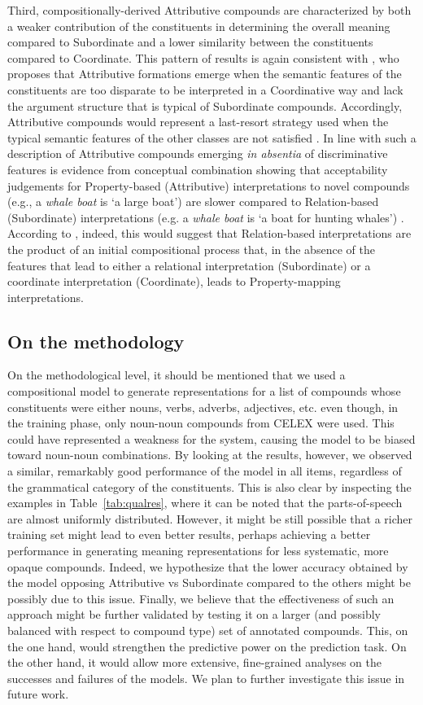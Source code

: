 \documentclass[output=paper]{langsci/langscibook}
\begin{document}
Third, compositionally-derived Attributive compounds are characterized by both a weaker contribution of the constituents in determining the overall meaning compared to Subordinate and a lower similarity between the constituents compared to Coordinate. This pattern of results is again consistent with \cite{lieber5OHC}, who proposes that Attributive formations emerge when the semantic
features of the constituents are too disparate to be interpreted in a Coordinative way and lack the argument structure that is typical of Subordinate compounds. Accordingly, Attributive compounds would represent a last-resort strategy used when the typical semantic features of the other classes are not satisfied \citep{lieber5OHC}. In line with such a description of Attributive compounds emerging \emph{in absentia} of discriminative features is evidence from conceptual combination showing that acceptability judgements for Property-based (Attributive) interpretations to novel compounds (e.g., a \emph{whale boat} is `a large boat’) are slower compared to Relation-based (Subordinate) interpretations (e.g. a \emph{whale boat} is `a boat for hunting whales') \citep{gagne2000}. According to \cite{gagne2015}, indeed, this would suggest that Relation-based interpretations are the product of an initial compositional process that, in the absence of the features that lead to either a relational interpretation (Subordinate) or a coordinate interpretation (Coordinate), leads to Property-mapping interpretations.

\subsection{On the methodology}

On the methodological level, it should be mentioned that we used a compositional model to generate representations for a list of compounds whose constituents were either nouns, verbs, adverbs, adjectives, etc. even though, in the training phase, only noun-noun compounds from CELEX were used. This could have represented a weakness for the system, causing the model to be biased toward noun-noun combinations. By looking at the results, however, we observed a similar, remarkably good performance of the model in all items, regardless of the grammatical category of the constituents. This is also clear by inspecting the examples in Table~\ref{tab:qualres}, where it can be noted that the parts-of-speech are almost uniformly distributed. However, it might be still possible that a richer training set might lead to even better results, perhaps achieving a better performance in generating meaning representations for less systematic, more opaque compounds. Indeed, we hypothesize that the lower accuracy obtained by the model opposing Attributive vs Subordinate compared to the others might be possibly due to this issue. Finally, we believe that the effectiveness of such an approach might be further validated by testing it on a larger (and possibly balanced with respect to compound type) set of annotated compounds. This, on the one hand, would strengthen the predictive power on the prediction task. On the other hand, it would allow more extensive, fine-grained analyses on the successes and failures of the models. We plan to further investigate this issue in future work.
\end{document}
